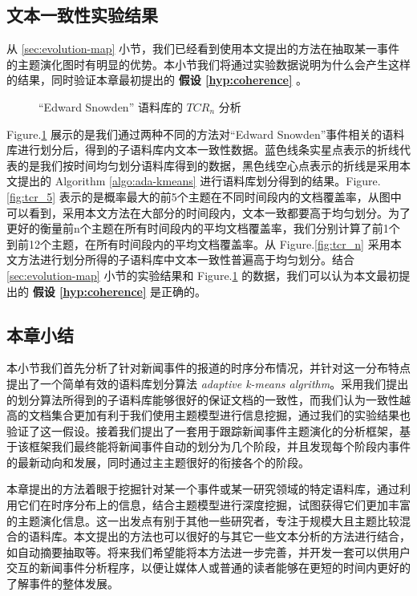\subsection{文本一致性实验结果}
从 \ref{sec:evolution-map} 小节，我们已经看到使用本文提出的方法在抽取某一事件的主题演化图时有明显的优势。本小节我们将通过实验数据说明为什么会产生这样的结果，同时验证本章最初提出的 \textbf{假设 \ref{hyp:coherence}} 。
\label{sec:coherence-result}
\begin{figure}[!htb]
	\centering
	\caption{“Edward Snowden” 语料库的 $TCR_n$ 分析}
	\label{fig:tcr}
\end{figure}

Figure.\ref{fig:tcr} 展示的是我们通过两种不同的方法对“Edward Snowden”事件相关的语料库进行划分后，得到的子语料库内文本一致性数据。蓝色线条实星点表示的折线代表的是我们按时间均匀划分语料库得到的数据，黑色线空心点表示的折线是采用本文提出的 Algorithm \ref{algo:ada-kmeans} 进行语料库划分得到的结果。Figure.\ref{fig:tcr_5} 表示的是概率最大的前5个主题在不同时间段内的文档覆盖率，从图中可以看到，采用本文方法在大部分的时间段内，文本一致都要高于均匀划分。为了更好的衡量前n个主题在所有时间段内的平均文档覆盖率，我们分别计算了前1个到前12个主题，在所有时间段内的平均文档覆盖率。从 Figure.\ref{fig:tcr_n} 采用本文方法进行划分所得的子语料库中文本一致性普遍高于均匀划分。结合 \ref{sec:evolution-map} 小节的实验结果和 Figure.\ref{fig:tcr} 的数据，我们可以认为本文最初提出的 \textbf{假设 \ref{hyp:coherence}} 是正确的。 

\subsection{本章小结}
本小节我们首先分析了针对新闻事件的报道的时序分布情况，并针对这一分布特点提出了一个简单有效的语料库划分算法 \emph{adaptive k-means algrithm}。采用我们提出的划分算法所得到的子语料库能够很好的保证文档的一致性，而我们认为一致性越高的文档集合更加有利于我们使用主题模型进行信息挖掘，通过我们的实验结果也验证了这一假设。接着我们提出了一套用于跟踪新闻事件主题演化的分析框架，基于该框架我们最终能将新闻事件自动的划分为几个阶段，并且发现每个阶段内事件的最新动向和发展，同时通过主主题很好的衔接各个的阶段。

本章提出的方法着眼于挖掘针对某一个事件或某一研究领域的特定语料库，通过利用它们在时序分布上的信息，结合主题模型进行深度挖掘，试图获得它们更加丰富的主题演化信息。这一出发点有别于其他一些研究者，专注于规模大且主题比较混合的语料库。本文提出的方法也可以很好的与其它一些文本分析的方法进行结合，如自动摘要抽取等。将来我们希望能将本方法进一步完善，并开发一套可以供用户交互的新闻事件分析程序，以便让媒体人或普通的读者能够在更短的时间内更好的了解事件的整体发展。




